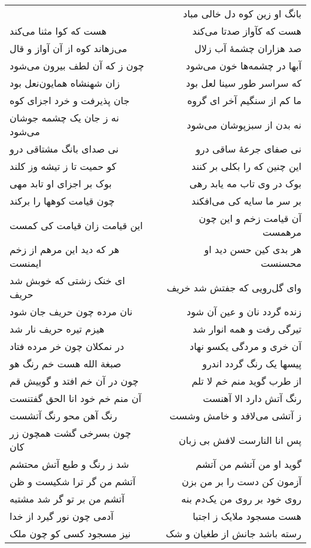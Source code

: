\begin{center}
\begin{longtable}{l p{0.5cm} r}
&&
بانگ او زین کوه دل خالی مباد
\\
هست که کوا مثنا می‌کند
&&
هست که کآواز صدتا می‌کند
\\
می‌زهاند کوه از آن آواز و قال
&&
صد هزاران چشمهٔ آب زلال
\\
چون ز که آن لطف بیرون می‌شود
&&
آبها در چشمه‌ها خون می‌شود
\\
زان شهنشاه همایون‌نعل بود
&&
که سراسر طور سینا لعل بود
\\
جان پذیرفت و خرد اجزای کوه
&&
ما کم از سنگیم آخر ای گروه
\\
نه ز جان یک چشمه جوشان می‌شود
&&
نه بدن از سبزپوشان می‌شود
\\
نی صدای بانگ مشتاقی درو
&&
نی صفای جرعهٔ ساقی درو
\\
کو حمیت تا ز تیشه وز کلند
&&
این چنین که را بکلی بر کنند
\\
بوک بر اجزای او تابد مهی
&&
بوک در وی تاب مه یابد رهی
\\
چون قیامت کوهها را برکند
&&
بر سر ما سایه کی می‌افکند
\\
این قیامت زان قیامت کی کمست
&&
آن قیامت زخم و این چون مرهمست
\\
هر که دید این مرهم از زخم ایمنست
&&
هر بدی کین حسن دید او محسنست
\\
ای خنک زشتی که خوبش شد حریف
&&
وای گل‌رویی که جفتش شد خریف
\\
نان مرده چون حریف جان شود
&&
زنده گردد نان و عین آن شود
\\
هیزم تیره حریف نار شد
&&
تیرگی رفت و همه انوار شد
\\
در نمکلان چون خر مرده فتاد
&&
آن خری و مردگی یکسو نهاد
\\
صبغة الله هست خم رنگ هو
&&
پیسها یک رنگ گردد اندرو
\\
چون در آن خم افتد و گوییش قم
&&
از طرب گوید منم خم لا تلم
\\
آن منم خم خود انا الحق گفتنست
&&
رنگ آتش دارد الا آهنست
\\
رنگ آهن محو رنگ آتشست
&&
ز آتشی می‌لافد و خامش وشست
\\
چون بسرخی گشت همچون زر کان
&&
پس انا النارست لافش بی زبان
\\
شد ز رنگ و طبع آتش محتشم
&&
گوید او من آتشم من آتشم
\\
آتشم من گر ترا شکیست و ظن
&&
آزمون کن دست را بر من بزن
\\
آتشم من بر تو گر شد مشتبه
&&
روی خود بر روی من یک‌دم بنه
\\
آدمی چون نور گیرد از خدا
&&
هست مسجود ملایک ز اجتبا
\\
نیز مسجود کسی کو چون ملک
&&
رسته باشد جانش از طغیان و شک
\\

\end{longtable}
\end{center}
